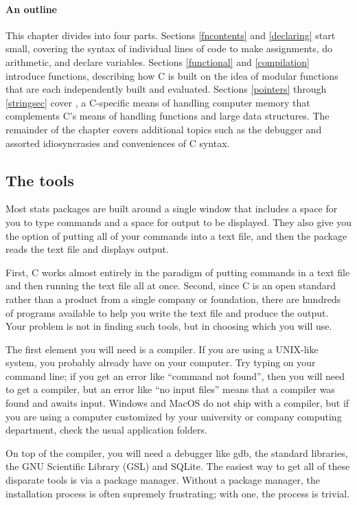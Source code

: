 \paragraph{An outline} 

This chapter divides into four parts.  Sections \ref{fncontents} and
\ref{declaring} start small, covering the syntax of individual lines
of code to make assignments, do arithmetic, and declare variables.
Sections \ref{functional} and \ref{compilation} introduce functions,
describing how C is built on the idea of modular functions that are each
independently built and evaluated.  Sections \ref{pointers} through
\ref{stringsec} cover , a C-specific means of handling
computer memory that complements C's means of handling functions and
large data structures. The remainder of the chapter covers additional
topics such as the debugger and assorted idiosyncrasies and conveniences
of C syntax.

\subsection{The tools} 
Most stats packages are built around a single window that includes a
space for you to type commands and a space for output to be displayed.
They also give you the option of putting all of your commands into a
text file, and then the package reads the text file and displays output.

First, C works almost entirely in the paradigm of putting commands in a
text file and then running the text file all at once. Second, since
C is an open standard rather than a product from a single company or
foundation, there
are hundreds of programs available to help you write the text file and
produce the output. Your problem is not in finding such tools, but in
choosing which you will use.

The first element you will need is a compiler. If you are using
a UNIX-like system, you probably already have  on your
computer. Try typing  on your command line; if you get an
error like ``command not found'', then you will need to get a compiler,
but an error like ``no input files'' means that a compiler was found
and awaits input. Windows and MacOS do not ship with a compiler, but if you
are using a computer customized by your university or company computing
department, check the usual application folders.

On top of the compiler, you will need a debugger like gdb, the standard
libraries, the GNU Scientific Library (GSL) and SQLite.  The easiest way
to get all of these disparate tools is via a package manager.  Without a
package manager, the installation process is often supremely frustrating;
with one, the process is trivial.

